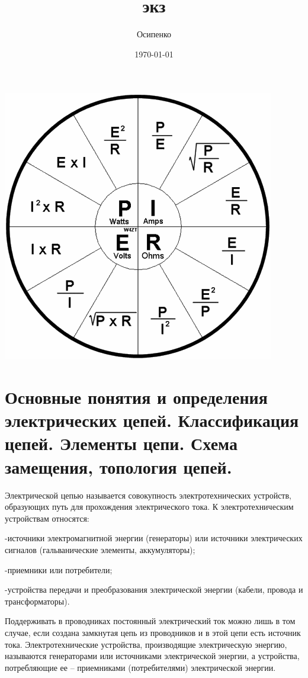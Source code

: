 \documentclass[a4paper, 12pt]{article}
\title{экз}
\author{Осипенко}
\date{\today}
\begin{document}
\sffamily
\maketitle
\begin{center}
    \includegraphics{int.png}
\end{center}
\section{Основные понятия и определения электрических цепей. Классификация цепей. Элементы цепи. Схема замещения, топология цепей.}
Электрической цепью называется совокупность электротехнических устройств, образующих путь для прохождения электрического тока. К электротехническим устройствам относятся:

    -источники электромагнитной энергии (генераторы) или источники электрических сигналов (гальванические элементы, аккумуляторы);

    -приемники или потребители;

    -устройства передачи и преобразования электрической энергии (кабели, провода и трансформаторы).

Поддерживать в проводниках постоянный электрический ток можно лишь в том случае, если создана замкнутая цепь из проводников и в этой цепи есть источник тока. Электротехнические устройства, производящие электрическую энергию, называются генераторами или источниками электрической энергии, а устройства, потребляющие ее – приемниками (потребителями) электрической энергии.\\
\end{document}
